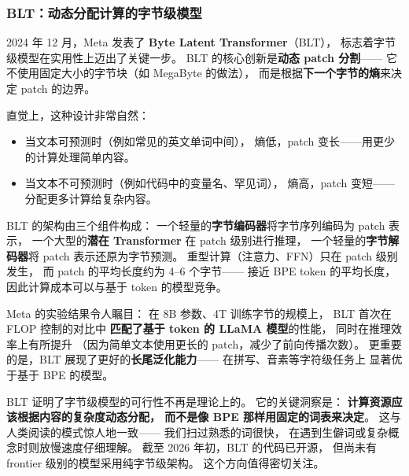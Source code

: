 \subsubsection{BLT：动态分配计算的字节级模型}

2024 年 12 月，Meta 发表了 \textbf{Byte Latent Transformer}（BLT），
标志着字节级模型在实用性上迈出了关键一步。
BLT 的核心创新是\textbf{动态 patch 分割}——
它不使用固定大小的字节块（如 MegaByte 的做法），
而是根据\textbf{下一个字节的熵}来决定 patch 的边界。

直觉上，这种设计非常自然：
\begin{itemize}[noitemsep]
  \item 当文本可预测时（例如常见的英文单词中间），
        熵低，patch 变长——用更少的计算处理简单内容。
  \item 当文本不可预测时（例如代码中的变量名、罕见词），
        熵高，patch 变短——分配更多计算给复杂内容。
\end{itemize}

BLT 的架构由三个组件构成：
一个轻量的\textbf{字节编码器}将字节序列编码为 patch 表示，
一个大型的\textbf{潜在 Transformer} 在 patch 级别进行推理，
一个轻量的\textbf{字节解码器}将 patch 表示还原为字节预测。
重型计算（注意力、FFN）只在 patch 级别发生，
而 patch 的平均长度约为 4--6 个字节——
接近 BPE token 的平均长度，
因此计算成本可以与基于 token 的模型竞争。

Meta 的实验结果令人瞩目：
在 8B 参数、4T 训练字节的规模上，
BLT 首次在 FLOP 控制的对比中
\textbf{匹配了基于 token 的 LLaMA 模型}的性能，
同时在推理效率上有所提升
（因为简单文本使用更长的 patch，减少了前向传播次数）。
更重要的是，BLT 展现了更好的\textbf{长尾泛化能力}——
在拼写、音素等字符级任务上
显著优于基于 BPE 的模型。

\begin{corebox}
BLT 证明了字节级模型的可行性不再是理论上的。
它的关键洞察是：
\textbf{计算资源应该根据内容的复杂度动态分配，
而不是像 BPE 那样用固定的词表来决定}。
这与人类阅读的模式惊人地一致——
我们扫过熟悉的词很快，
在遇到生僻词或复杂概念时则放慢速度仔细理解。
截至 2026 年初，BLT 的代码已开源，
但尚未有 frontier 级别的模型采用纯字节级架构。
这个方向值得密切关注。
\end{corebox}

